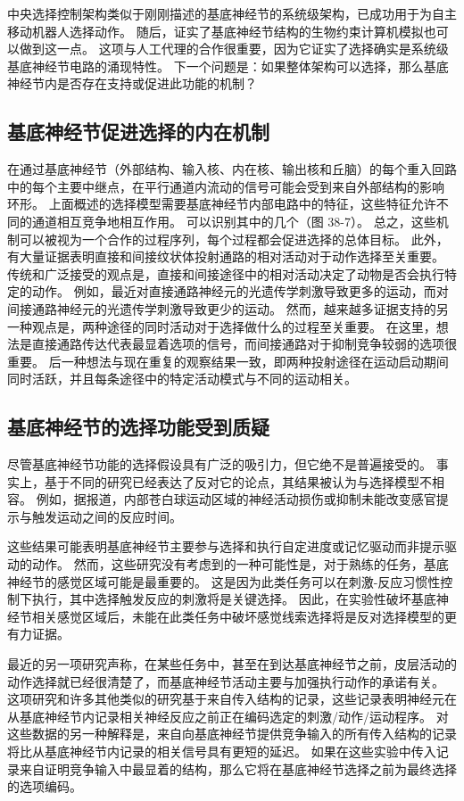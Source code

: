 中央选择控制架构类似于刚刚描述的基底神经节的系统级架构，已成功用于为自主移动机器人选择动作。 随后，证实了基底神经节结构的生物约束计算机模拟也可以做到这一点。 这项与人工代理的合作很重要，因为它证实了选择确实是系统级基底神经节电路的涌现特性。 下一个问题是：如果整体架构可以选择，那么基底神经节内是否存在支持或促进此功能的机制？

\subsection{基底神经节促进选择的内在机制}
在通过基底神经节（外部结构、输入核、内在核、输出核和丘脑）的每个重入回路中的每个主要中继点，在平行通道内流动的信号可能会受到来自外部结构的影响 环形。 上面概述的选择模型需要基底神经节内部电路中的特征，这些特征允许不同的通道相互竞争地相互作用。 可以识别其中的几个（图 38-7）。 总之，这些机制可以被视为一个合作的过程序列，每个过程都会促进选择的总体目标。 此外，有大量证据表明直接和间接纹状体投射通路的相对活动对于动作选择至关重要。 传统和广泛接受的观点是，直接和间接途径中的相对活动决定了动物是否会执行特定的动作。 例如，最近对直接通路神经元的光遗传学刺激导致更多的运动，而对间接通路神经元的光遗传学刺激导致更少的运动。 然而，越来越多证据支持的另一种观点是，两种途径的同时活动对于选择做什么的过程至关重要。 在这里，想法是直接通路传达代表最显着选项的信号，而间接通路对于抑制竞争较弱的选项很重要。 后一种想法与现在重复的观察结果一致，即两种投射途径在运动启动期间同时活跃，并且每条途径中的特定活动模式与不同的运动相关。

\subsection{基底神经节的选择功能受到质疑}
尽管基底神经节功能的选择假设具有广泛的吸引力，但它绝不是普遍接受的。 事实上，基于不同的研究已经表达了反对它的论点，其结果被认为与选择模型不相容。 例如，据报道，内部苍白球运动区域的神经活动损伤或抑制未能改变感官提示与触发运动之间的反应时间。

这些结果可能表明基底神经节主要参与选择和执行自定进度或记忆驱动而非提示驱动的动作。 然而，这些研究没有考虑到的一种可能性是，对于熟练的任务，基底神经节的感觉区域可能是最重要的。 这是因为此类任务可以在刺激-反应习惯性控制下执行，其中选择触发反应的刺激将是关键选择。 因此，在实验性破坏基底神经节相关感觉区域后，未能在此类任务中破坏感觉线索选择将是反对选择模型的更有力证据。

最近的另一项研究声称，在某些任务中，甚至在到达基底神经节之前，皮层活动的动作选择就已经很清楚了，而基底神经节活动主要与加强执行动作的承诺有关。 这项研究和许多其他类似的研究基于来自传入结构的记录，这些记录表明神经元在从基底神经节内记录相关神经反应之前正在编码选定的刺激/动作/运动程序。 对这些数据的另一种解释是，来自向基底神经节提供竞争输入的所有传入结构的记录将比从基底神经节内记录的相关信号具有更短的延迟。 如果在这些实验中传入记录来自证明竞争输入中最显着的结构，那么它将在基底神经节选择之前为最终选择的选项编码。

